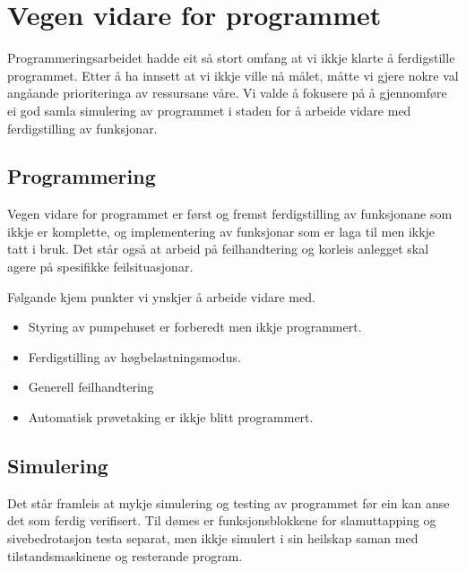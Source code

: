 \section{Vegen vidare for programmet}
\thispagestyle{fancy}

Programmeringsarbeidet hadde eit så stort omfang at vi ikkje klarte å ferdigstille programmet.
Etter å ha innsett at vi ikkje ville nå målet, måtte vi gjere nokre val angåande prioriteringa av ressursane våre. 
Vi valde å fokusere på å gjennomføre ei god samla simulering av programmet i staden for å arbeide vidare med ferdigstilling av funksjonar.

\subsection{Programmering}

Vegen vidare for programmet er først og fremst ferdigstilling av funksjonane som ikkje er komplette, og 
implementering av funksjonar som er laga til men ikkje tatt i bruk. 
Det står også at arbeid på feilhandtering og korleis anlegget skal agere på spesifikke feilsituasjonar.

Følgande kjem punkter vi ynskjer å arbeide vidare med.

\begin{itemize}
    \item Styring av pumpehuset er forberedt men ikkje programmert. 
    \item Ferdigstilling av høgbelastningsmodus.
    \item Generell feilhandtering
    \item Automatisk prøvetaking er ikkje blitt programmert.
\end{itemize}



\subsection{Simulering}

Det står framleis at mykje simulering og testing av programmet før ein kan anse det som ferdig verifisert.
Til dømes er funksjonsblokkene for slamuttapping og sivebedrotasjon testa separat, men ikkje simulert i sin heilskap saman med
tilstandsmaskinene og resterande program.

